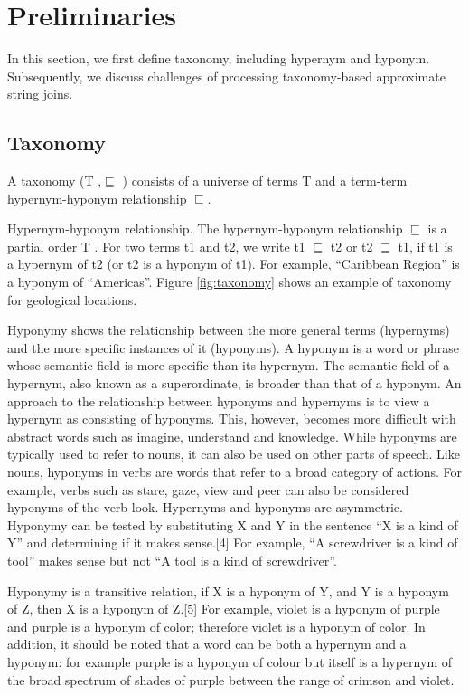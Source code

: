 \documentclass{sig-alternate}
\begin{document}
\section{Preliminaries} \label{sec:preliminaries}



In this section, we first  define taxonomy, including
hypernym and hyponym. Subsequently,
we discuss challenges of processing taxonomy-based approximate string joins.


\subsection{Taxonomy}

A taxonomy (T ,$\sqsubseteq$ ) consists of a universe of terms T and
a term-term hypernym-hyponym relationship $\sqsubseteq$.

Hypernym-hyponym relationship. The hypernym-hyponym relationship
$\sqsubseteq$ is a partial order T . For two terms t1 and t2,
we write t1 $\sqsubseteq$ t2 or t2 $\sqsupseteq$ t1, if t1 is a hypernym of t2 (or t2
is a hyponym of t1). For example, ``Caribbean Region'' is a hyponym of
``Americas''. Figure  \ref{fig:taxonomy} shows an example of taxonomy for geological locations.



Hyponymy shows the relationship between the more general terms (hypernyms) and the more specific instances of it (hyponyms). A hyponym is a word or phrase whose semantic field is more specific than its hypernym. The semantic field of a hypernym, also known as a superordinate, is broader than that of a hyponym. An approach to the relationship between hyponyms and hypernyms is to view a hypernym as consisting of hyponyms. This, however, becomes more difficult with abstract words such as imagine, understand and knowledge. While hyponyms are typically used to refer to nouns, it can also be used on other parts of speech. Like nouns, hyponyms in verbs are words that refer to a broad category of actions. For example, verbs such as stare, gaze, view and peer can also be considered hyponyms of the verb look.
Hypernyms and hyponyms are asymmetric. Hyponymy can be tested by substituting X and Y in the sentence ``X is a kind of Y'' and determining if it makes sense.[4] For example, ``A screwdriver is a kind of tool''  makes sense but not ``A tool is a kind of screwdriver''.


Hyponymy is a transitive relation, if X is a hyponym of Y, and Y is a hyponym of Z, then X is a hyponym of Z.[5] For example, violet is a hyponym of purple and purple is a hyponym of color; therefore violet is a hyponym of color. In addition, it should be noted that a word can be both a hypernym and a hyponym: for example purple is a hyponym of colour but itself is a hypernym of the broad spectrum of shades of purple between the range of crimson and violet.
\end{document}
